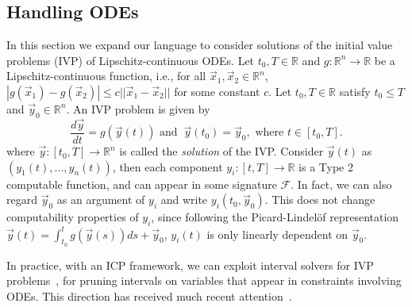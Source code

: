 \documentclass[prodmode]{acmsmall} %
\begin{document}
\subsection{Handling ODEs}
In this section we expand our language to consider solutions of the initial value problems (IVP) of Lipschitz-continuous ODEs. Let $t_0, T\in \mathbb{R}$ and $g:\mathbb{R}^n\rightarrow \mathbb{R}$ be a Lipschitz-continuous function, i.e., for all $\vec x_1, \vec x_2\in\mathbb{R}^n$, $|g(\vec x_1)-g(\vec x_2)|\leq c||\vec x_1-\vec x_2||$ for some constant $c$. Let $t_0, T\in \mathbb{R}$ satisfy $t_0\leq T$ and $\vec y_0\in \mathbb{R}^n$. An IVP problem is given by 
$$\frac{d\vec y}{dt} = g(\vec y(t))\mbox{ and } \ \vec y(t_0) = \vec y_0, \mbox{ where }t\in [t_0, T].$$
where $\vec y: [t_0, T]\rightarrow \mathbb{R}^n$ is called the {\em solution} of the IVP. Consider $\vec y(t)$ as $(y_1(t),...,y_n(t))$, then each component $y_i: [t, T]\rightarrow \mathbb{R}$ is a Type 2 computable function, and can appear in some signature $\mathcal{F}$. In fact, we can also regard $\vec y_0$ as an argument of $y_i$ and write $y_i(t_0, \vec y_0)$. This does not change computability properties of $y_i$, since following the Picard-Lindel\"of representation $\vec y(t) = \int_{t_0}^t g(\vec y(s))ds + \vec y_0$, $y_i(t)$ is only linearly dependent on $\vec y_0$. 

In practice, with an ICP framework, we can exploit interval solvers for IVP problems~\cite{DBLP:journals/amc/NedialkovJC99}, for pruning intervals on variables that appear in constraints involving ODEs. This direction has received much recent attention~\cite{DBLP:conf/sefm/EggersRNF11,DBLP:conf/atva/EggersFH08,DBLP:conf/cp/GoldsztejnMEH10,DBLP:journals/sttt/IshiiUH11}. 
\end{document}
